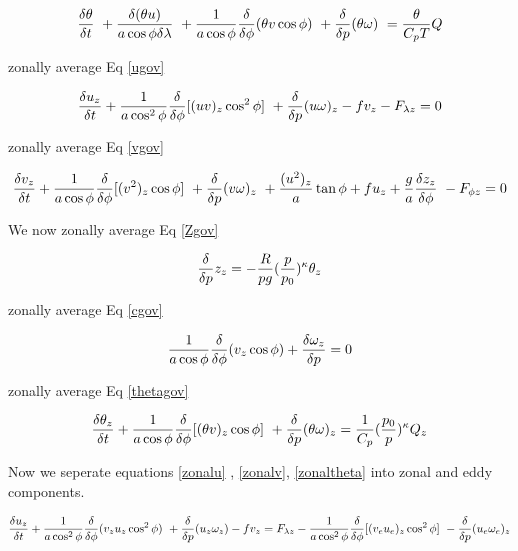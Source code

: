 \documentclass{article}
\begin{document}
\begin{equation}
\frac{\delta \theta}{\delta t} \
+ \frac{\delta (\theta u)}{a \cos{\phi} \delta \lambda} \
+ \frac{1}{a \cos{\phi}} \frac{\delta}{\delta \phi}(\theta v \cos{\phi}) \
+ \frac{\delta}{\delta p} (\theta \omega) \
= \frac{\theta}{C_p T} Q
\end{equation}

zonally average Eq \ref{ugov}

\begin{equation}
\frac{\delta u_z}{\delta t} + \frac{1}{a\cos^2{\phi}} \frac{\delta}{\delta \phi} [ (uv)_z \cos^2{\phi} ] \
+ \frac{\delta}{\delta p} (u\omega)_z - fv_z - F_{{\lambda}z} = 0
\label{zonalu}
\end{equation}

zonally average Eq \ref{vgov}

\begin{equation}
\frac{\delta v_z}{\delta t} + \frac{1}{a\cos{\phi}} \frac{\delta}{\delta \phi}[(v^2)_z \cos{\phi}] \
+ \frac{\delta}{\delta p} (v \omega)_z \
+ \frac{(u^2)_z}{a} \tan \phi + fu_z + \frac{g}{a} \frac{\delta z_z}{\delta \phi} \
- F_{{\phi}z} = 0
\label{zonalv}
\end{equation}

We now zonally average Eq \ref{Zgov}

\begin{equation}
\frac{\delta}{\delta p} z_z = - \frac{R}{pg}(\frac{p}{p_0})^\kappa \theta_z
\label{zonaltheta}
\end{equation}

zonally average Eq \ref{cgov}

\begin{equation}
\frac{1}{a \cos{\phi}} \frac{\delta}{\delta \phi} (v_z \cos{\phi}) + \frac{\delta \omega_z}{\delta p} = 0
\label{zonalc}
\end{equation}

zonally average Eq \ref{thetagov}

\begin{equation}
\frac{\delta \theta_z}{\delta t} + \frac{1}{a\cos{\phi}} \frac{\delta}{\delta \phi} [ (\theta v)_z \cos {\phi}] \
+ \frac{\delta}{\delta p}(\theta \omega)_z = \frac{1}{C_p}(\frac{p_0}{p})^\kappa Q_z
\label{zonaltheta}
\end{equation}

Now we seperate equations \ref{zonalu} , \ref{zonalv}, \ref{zonaltheta} into
zonal and eddy components.

\begin{equation}
\frac{\delta u_z}{\delta t} + \frac{1}{a\cos^2{\phi}} \frac{\delta}{\delta \phi} (v_z u_z \cos^2 \phi ) \
+ \frac{\delta}{\delta p} (u_z \omega_z) - f v_z = \\
F_{\lambda z} - \frac{1}{a\cos^2{\phi}} \frac{\delta}{\delta \phi} [ ( v_e u_e )_z \cos^2 \phi ] \
- \frac{\delta}{\delta p} (u_e \omega_e )_z
\label{zeu}
\end{equation}
\end{document}
